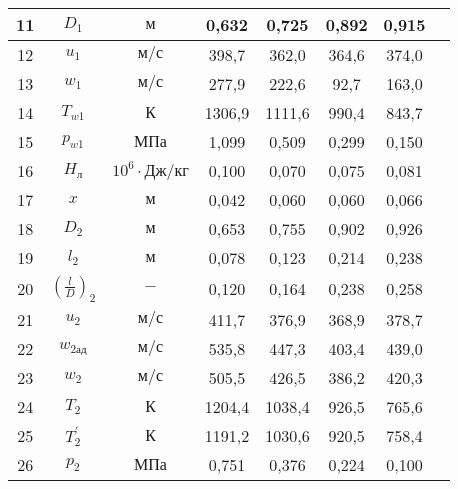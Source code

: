 \begin{landscape}
\begin{center}
\begin{longtable}{|c|c|c|c|c|c|c|c|}
            11 & $D_1$ & $м$ & 0,632 & 0,725 & 0,892 & 0,915 \\\hline
            
            12 & $u_1$ & $м/с$ & 398,7 & 362,0 & 364,6 & 374,0 \\\hline
            
            13 & $w_1$ & $м/с$ & 277,9 & 222,6 & 92,7 & 163,0 \\\hline
            
            14 & $T_{w1}$ & $К$ & 1306,9 & 1111,6 & 990,4 & 843,7 \\\hline
            
            15 & $p_{w1}$ & $МПа$ & 1,099 & 0,509 & 0,299 & 0,150 \\\hline
            
            16 & $H_л$ & $10^6 \cdot Дж/кг$ & 0,100 & 0,070 & 0,075 & 0,081 \\\hline
            
            17 & $x$ & $м$ & 0,042 & 0,060 & 0,060 & 0,066 \\\hline
            
            18 & $D_2$ & $м$ & 0,653 & 0,755 & 0,902 & 0,926 \\\hline
            
            19 & $l_2$ & $м$ & 0,078 & 0,123 & 0,214 & 0,238 \\\hline
            
            20 & $\left( \frac{l}{D} \right)_2$ & $-$ & 0,120 & 0,164 & 0,238 & 0,258 \\\hline
            
            21 & $u_2$ & $м/с$ & 411,7 & 376,9 & 368,9 & 378,7 \\\hline
            
            22 & $w_{2ад}$ & $м/с$ & 535,8 & 447,3 & 403,4 & 439,0 \\\hline
            
            23 & $w_2$ & $м/с$ & 505,5 & 426,5 & 386,2 & 420,3 \\\hline
            
            24 & $T_2$ & $К$ & 1204,4 & 1038,4 & 926,5 & 765,6 \\\hline
            
            25 & $T_2^\prime$ & $К$ & 1191,2 & 1030,6 & 920,5 & 758,4 \\\hline
            
            26 & $p_2$ & $МПа$ & 0,751 & 0,376 & 0,224 & 0,100 \\\hline
            

\end{longtable}
\end{center}
\end{landscape}

